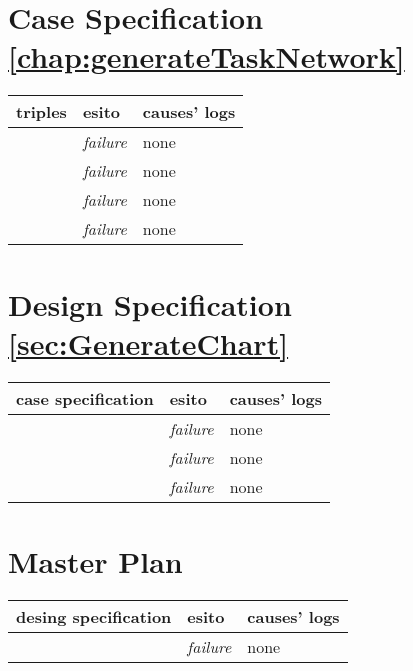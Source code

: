 \section{Case Specification \ref{chap:generateTaskNetwork}}

\begin{table}[h!]
  \begin{center}
    \begin{tabular}{| l | l | p{60mm} |}
    \hline
    \textbf{triples} & \textbf{esito} & \textbf{causes' logs} \\
	\hline    
	\nameref{sec:TNTaskRepresentation} & \emph{failure} & none \\
    \hline
	\nameref{sec:dimensionTaskRepresentation} & \emph{failure} & none \\
    \hline
	\nameref{sec:TNDependencyrepresentation} & \emph{failure} & none \\
    \hline
    \nameref{sec:tn_criticalPathRepresentation} & \emph{failure} & none \\
    \hline
    \end{tabular}
  \end{center}
\end{table}

\section{Design Specification \ref{sec:GenerateChart}}

\begin{table}[h!]
  \begin{center}
    \begin{tabular}{| l | l | p{60mm} |}
    \hline
    \textbf{case specification} & \textbf{esito} & \textbf{causes' logs} \\
	\hline    
	\nameref{chap:generateGantt} & \emph{failure} & none \\
    \hline
	\nameref{chap:generateWBS} & \emph{failure} & none \\
    \hline
	\nameref{chap:generateTaskNetwork} & \emph{failure} & none \\
    \hline
    \end{tabular}
  \end{center}
\end{table}

\section{Master Plan}

\begin{table}[h!]
  \begin{center}
    \begin{tabular}{| l | l | p{60mm} |}
    \hline
    \textbf{desing specification} & \textbf{esito} & \textbf{causes' logs} \\
	\hline    
	\nameref{chap:generateChartDesingSpecification} & \emph{failure} & none \\
    \hline
    \end{tabular}
  \end{center}
\end{table}